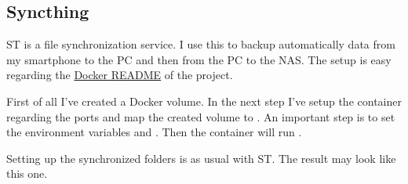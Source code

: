 

\subsection{Syncthing}

\gls{ST} is a file synchronization service. I use this to backup automatically
data from my smartphone to the PC and then from the PC to the NAS. The setup
is easy regarding the \href{https://github.com/syncthing/syncthing/blob/main/README-Docker.md}{Docker README}
of the project.
\bigbreak

First of all I've created a \gls{Docker} volume. In the next step I've setup
the container regarding the ports and map the created volume to .
An important step is to set the environment variables  and
. Then the container will run .
\bigbreak

Setting up the synchronized folders is as usual with \gls{ST}. The result
may look like this one.

